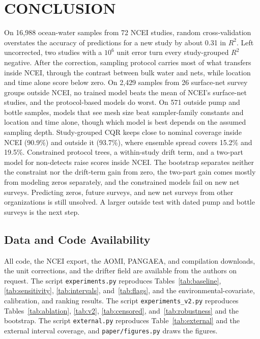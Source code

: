 \documentclass[12pt,a4paper]{report}
\newcommand{\Rsq}{$R^2$}
\begin{document}
\chapter{CONCLUSION}

On 16,988 ocean-water samples from 72 NCEI studies, random cross-validation overstates the accuracy of predictions for a new study by about 0.31 in \Rsq{}. Left uncorrected, two studies with a $10^6$ unit error turn every study-grouped \Rsq{} negative. After the correction, sampling protocol carries most of what transfers inside NCEI, through the contrast between bulk water and nets, while location and time alone score below zero. On 2,429 samples from 26 surface-net survey groups outside NCEI, no trained model beats the mean of NCEI's surface-net studies, and the protocol-based models do worst. On 571 outside pump and bottle samples, models that see mesh size beat sampler-family constants and location and time alone, though which model is best depends on the assumed sampling depth. Study-grouped CQR keeps close to nominal coverage inside NCEI (90.9\%) and outside it (93.7\%), where ensemble spread covers 15.2\% and 19.5\%. Constrained protocol trees, a within-study drift term, and a two-part model for non-detects raise scores inside NCEI. The bootstrap separates neither the constraint nor the drift-term gain from zero, the two-part gain comes mostly from modeling zeros separately, and the constrained models fail on new net surveys. Predicting zeros, future surveys, and new net surveys from other organizations is still unsolved. A larger outside test with dated pump and bottle surveys is the next step.

\section*{Data and Code Availability}

All code, the NCEI export, the AOMI, PANGAEA, and compilation downloads, the unit corrections, and the drifter field are available from the authors on request. The script \texttt{experiments.py} reproduces Tables~\ref{tab:baseline}, \ref{tab:sensitivity}, \ref{tab:intervals}, and~\ref{tab:flags}, and the environmental-covariate, calibration, and ranking results. The script \texttt{experiments\_v2.py} reproduces Tables~\ref{tab:ablation}, \ref{tab:v2}, \ref{tab:censored}, and~\ref{tab:robustness} and the bootstrap. The script \texttt{external.py} reproduces Table~\ref{tab:external} and the external interval coverage, and \texttt{paper/figures.py} draws the figures.

\cleardoublepage
{}
{}


\end{document}
